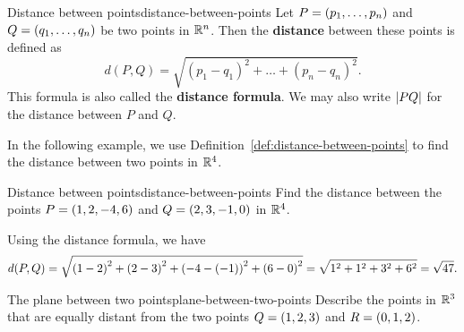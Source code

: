 \begin{definition}{Distance between points}{distance-between-points}
  Let $P=\left(p_{1},\ldots,p_{n}\right)$ and $Q=\left(q_{1},\ldots,q_{n}\right)$ be
  two points in $\mathbb{R}^{n}$. Then the
  \textbf{distance}
  between these points is defined as
  \begin{equation*}
    d(P, Q) = \sqrt{(p_1-q_1)^2 + \ldots + (p_n-q_n)^2}.
  \end{equation*}
  This formula is also called the \textbf{distance
    formula}. We may also write $\left|PQ\right|$
  for the distance between $P$ and $Q$.
\end{definition}

In the following example, we use Definition~\ref{def:distance-between-points} to find the distance between two
points in $\mathbb{R}^4$.

\begin{example}{Distance between points}{distance-between-points}
  Find the distance between the points $P=\left(1,2,-4,6\right)$ and
  $Q=\left(2,3,-1,0\right)$ in $\mathbb{R}^{4}$.
\end{example}

\begin{solution}
  Using the distance formula, we have
  \begin{equation*}
    d(P,Q)= \sqrt{ \left(1-2\right) ^{2}+\left(2-3\right)
      ^{2}+\left(-4-\left(-1\right) \right) ^{2}+\left(6-0\right)^{2}} =
    \sqrt{1^2+1^2+3^2+6^2} = \sqrt{47}.
  \end{equation*}
\end{solution}

\begin{example}{The plane between two points}{plane-between-two-points}
  Describe the points in $\mathbb{R}^3$ that are equally distant from the two
  points $Q=\left(1,2,3\right) $ and $R=\left(0,1,2\right)$.
\end{example}

